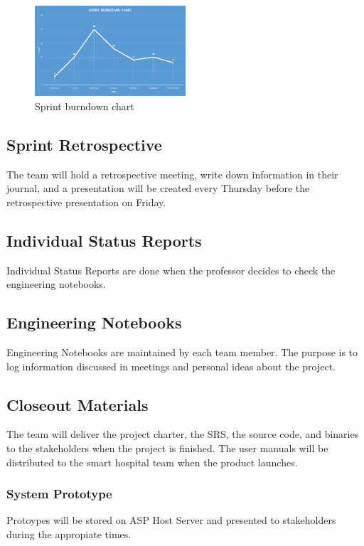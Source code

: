 \begin{figure}[h!]
    \centering
    \includegraphics[width=0.5\textwidth]{images/test_image}
    \caption{Sprint burndown chart}
\end{figure}

\subsection{Sprint Retrospective}
The team will hold a retrospective meeting, write down information in their journal, and a presentation will be created every Thursday before the retrospective presentation on Friday.

\subsection{Individual Status Reports}
Individual Status Reports are done when the professor decides to check the engineering notebooks.

\subsection{Engineering Notebooks}
Engineering Notebooks are maintained by each team member. The purpose is to log information discussed in meetings and personal ideas about the project.

\subsection{Closeout Materials}
The team will deliver the project charter, the SRS, the source code, and binaries to the stakeholders when the project is finished. The user manuals will be distributed to the smart hospital team when the product launches.

\subsubsection{System Prototype}
Protoypes will be stored on ASP Host Server and presented to stakeholders during the appropiate times.

